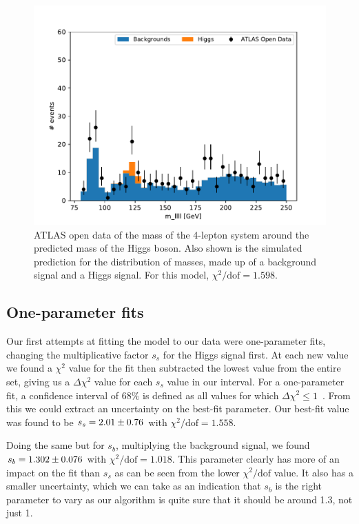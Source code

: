 \documentclass[11pt]{article}
\newcommand{\chisq}{\chi^2}
\newcommand{\chisqdof}{\chi^2/\mathrm{dof}}
\numberwithin{equation}{section}
\numberwithin{figure}{section}
\numberwithin{table}{section}
\begin{document}
\begin{figure}[h]
    \begin{center}
        \includegraphics[width=.6\textwidth]{Plots/no_fit_hist.pdf}
        \caption{ATLAS open data of the mass of the 4-lepton system around the predicted mass of the Higgs boson. Also shown is the simulated prediction for the distribution of masses, made up of a background signal and a Higgs signal. For this model, $\chisqdof=\num{1.598}$.}
        \label{fig:no_fit_hist}
    \end{center}
\end{figure}

\subsection{One-parameter fits}
Our first attempts at fitting the model to our data were one-parameter fits, changing the multiplicative factor $s_s$ for the Higgs signal first. At each new value we found a $\chisq$ value for the fit then subtracted the lowest value from the entire set, giving us a $\Delta\chisq$ value for each $s_s$ value in our interval. For a one-parameter fit, a confidence interval of $68\%$ is defined as all values for which $\Delta\chisq\leq1$~\cite{XRay_energy_spectra}. From this we could extract an uncertainty on the best-fit parameter. Our best-fit value was found to be $s_s=\num{2.01 \pm0.76}$ with $\chisqdof=1.558$.

Doing the same but for $s_b$, multiplying the background signal, we found $s_b=\num{1.302\pm0.076}$ with $\chisqdof=1.018$. This parameter clearly has more of an impact on the fit than $s_s$ as can be seen from the lower $\chisqdof$ value. It also has a smaller uncertainty, which we can take as an indication that $s_b$ is the right parameter to vary as our algorithm is quite sure that it should be around 1.3, not just 1.
\end{document}
